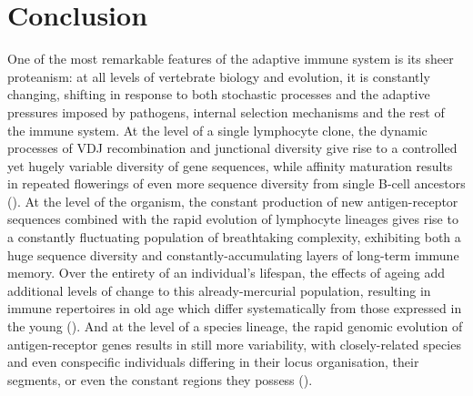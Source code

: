 \chapter*{Conclusion}  
\label{chap:conclusion}
\onehalfspacing

One of the most remarkable features of the adaptive immune system is its sheer proteanism: at all levels of vertebrate biology and evolution, it is constantly changing, shifting in response to both stochastic processes and the adaptive pressures imposed by pathogens, internal selection mechanisms and the rest of the immune system. At the level of a single lymphocyte clone, the dynamic processes of VDJ recombination and junctional diversity give rise to a controlled yet hugely variable diversity of gene sequences, while affinity maturation results in repeated flowerings of even more sequence diversity from single \naive B-cell ancestors (). At the level of the organism, the constant production of new antigen-receptor sequences combined with the rapid evolution of lymphocyte lineages gives rise to a constantly fluctuating population of breathtaking complexity, exhibiting both a huge \naive sequence diversity and constantly-accumulating layers of long-term immune memory. Over the entirety of an individual's lifespan, the effects of ageing add additional levels of change to this already-mercurial population, resulting in immune repertoires in old age which differ systematically from those expressed in the young (). And at the level of a species lineage, the rapid genomic evolution of antigen-receptor genes results in still more variability, with closely-related species and even conspecific individuals \parencite{corcoran2016igdiscover} differing in their locus organisation, their \vh segments, or even the constant regions they possess ().

